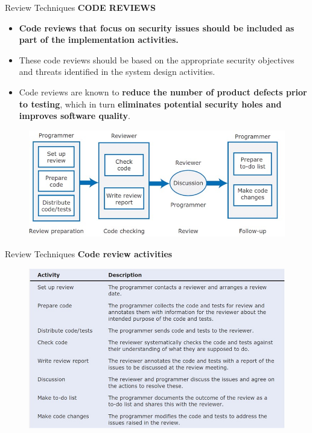 \documentclass{beamer}
\begin{document}
\begin{frame}{Review Techniques}
	\textbf{CODE REVIEWS}
	\begin{itemize}
		\item\textbf{ Code reviews that focus on security issues should be included as part of the implementation activities. }
		\item These code reviews should be based on the appropriate security objectives and threats identified in the        system design activities.
		\item Code reviews are known to \textbf{reduce the number of product defects prior to testing}, which in turn \textbf{eliminates   potential security holes and improves software quality}.
		
	\end{itemize}
	\begin{figure}
	\includegraphics[scale=.4]{img/m3_20}
\end{figure}
\end{frame}
\begin{frame}{Review Techniques}
	\textbf{Code review activities}
	\begin{figure}
		\includegraphics[scale=.7]{img/m3_21}
	\end{figure}
\end{frame}
\end{document}
